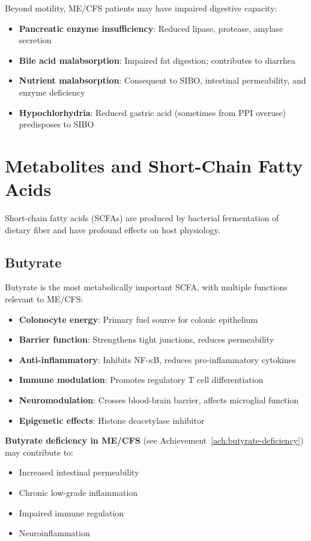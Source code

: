 Beyond motility, ME/CFS patients may have impaired digestive capacity:

\begin{itemize}
    \item \textbf{Pancreatic enzyme insufficiency}: Reduced lipase, protease, amylase secretion
    \item \textbf{Bile acid malabsorption}: Impaired fat digestion; contributes to diarrhea
    \item \textbf{Nutrient malabsorption}: Consequent to SIBO, intestinal permeability, and enzyme deficiency
    \item \textbf{Hypochlorhydria}: Reduced gastric acid (sometimes from PPI overuse) predisposes to SIBO
\end{itemize}

\section{Metabolites and Short-Chain Fatty Acids}
\label{sec:metabolites}

Short-chain fatty acids (SCFAs) are produced by bacterial fermentation of dietary fiber and have profound effects on host physiology.

\subsection{Butyrate}

Butyrate is the most metabolically important SCFA, with multiple functions relevant to ME/CFS:

\begin{itemize}
    \item \textbf{Colonocyte energy}: Primary fuel source for colonic epithelium
    \item \textbf{Barrier function}: Strengthens tight junctions, reduces permeability
    \item \textbf{Anti-inflammatory}: Inhibits NF-$\kappa$B, reduces pro-inflammatory cytokines
    \item \textbf{Immune modulation}: Promotes regulatory T cell differentiation
    \item \textbf{Neuromodulation}: Crosses blood-brain barrier, affects microglial function
    \item \textbf{Epigenetic effects}: Histone deacetylase inhibitor
\end{itemize}

\textbf{Butyrate deficiency in ME/CFS} (see Achievement~\ref{ach:butyrate-deficiency}) may contribute to:
\begin{itemize}
    \item Increased intestinal permeability
    \item Chronic low-grade inflammation
    \item Impaired immune regulation
    \item Neuroinflammation
\end{itemize}

